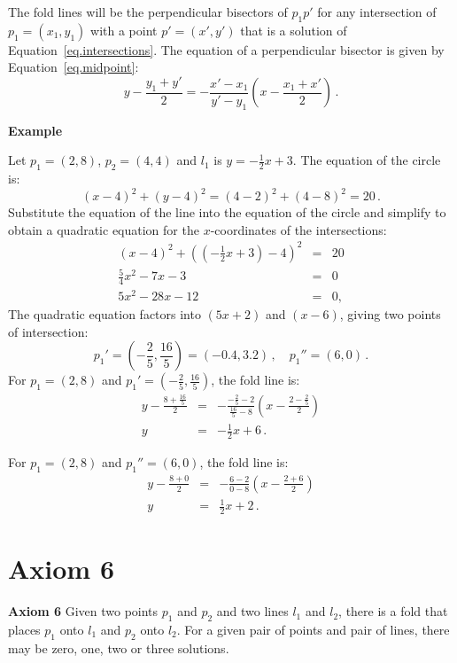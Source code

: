 \documentclass[11pt,a4paper]{article}
\newcommand*{\disfrac}[2]{\displaystyle\frac{#1}{#2}}
\newenvironment{form}[1]{%
\begin{displaymath}%
\renewcommand{\arraystretch}{#1}%
\begin{array}{lcl}}%
{\end{array}%
\end{displaymath}%
}
\begin{document}
The fold lines will be the perpendicular bisectors of $p_1p'$ for any intersection of $p_1=(x_1,y_1)$ with a point $p'=(x',y')$ that is a solution of Equation~\ref{eq.intersections}. The equation of a perpendicular bisector is given by Equation~\ref{eq.midpoint}:
\begin{equation}
y - \disfrac{y_1+y'}{2} = -\disfrac{x'-x_1}{y'-y_1}\left(x-\disfrac{x_1+x'}{2}\right)\,.\label{eq.midpoint}
\end{equation}

\textbf{Example}

Let $p_1=(2,8)$, $p_2=(4,4)$ and $l_1$ is $y=-\disfrac{1}{2}x +3$. The equation of the circle is:
\[
(x-4)^2 + (y-4)^2 = (4-2)^2+(4-8)^2=20\,.
\]
Substitute the equation of the line into the equation of the circle and simplify to obtain a quadratic equation for the $x$-coordinates of the intersections:
\begin{form}{1.5}
(x-4)^2 + \left((-\disfrac{1}{2}x+3)-4\right)^2&=&20\\
\disfrac{5}{4}x^2-7x-3 &=&0\\
5x^2 -28x -12&=&0, 
\end{form}
The quadratic equation factors into $(5x+2)$ and $(x-6)$, giving two points of intersection:
\[
p_1'=\left(-\disfrac{2}{5},\disfrac{16}{5}\right) = (-0.4,3.2)\,,\quad p_1''=(6,0)\,.
\]
For $p_1=(2,8)$ and $p_1'=\left(-\disfrac{2}{5},\disfrac{16}{5}\right)$, the fold line is:
\begin{form}{1.5}
y-\disfrac{8+\frac{16}{5}}{2}&=&-\disfrac{-\frac{2}{5}-2}{\frac{16}{5}-8}\left(x-\disfrac{2-\frac{2}{5}}{2}\right)\\
y&=&-\disfrac{1}{2}x+6\,.
\end{form}

For $p_1=(2,8)$ and $p_1''=(6,0)$, the fold line is:
\begin{form}{1.5}
y-\disfrac{8+0}{2}&=&-\disfrac{6-2}{0-8}\left(x-\disfrac{2+6}{2}\right)\\
y&=&\disfrac{1}{2}x+2\,.
\end{form}

\newpage
\section{Axiom 6}


\textbf{Axiom 6} 
Given two points $p_1$ and $p_2$ and two lines $l_1$ and $l_2$, there is a fold that places $p_1$ onto $l_1$ and $p_2$ onto $l_2$. For a given pair of points and pair of lines, there may be zero, one, two or three solutions.
\end{document}
